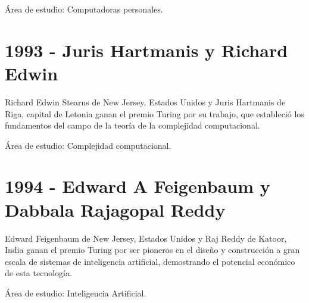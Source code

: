 \documentclass[a4paper, 11pt]{article}
\begin{document}
\noindent Área de estudio: Computadoras personales.
\newline

\section*{1993 - Juris Hartmanis y Richard Edwin}
\noindent Richard Edwin Stearns de New Jersey, Estados Unidos y Juris Hartmanis de Riga, capital de Letonia ganan el premio Turing por su trabajo, que estableció los fundamentos del campo de la teoría de la complejidad computacional.

\noindent Área de estudio: Complejidad computacional.
\newline


\section*{1994 - Edward A Feigenbaum y Dabbala Rajagopal Reddy}
\noindent Edward Feigenbaum de New Jersey, Estados Unidos y Raj Reddy de Katoor, India ganan el premio Turing por ser pioneros en el diseño y construcción a gran escala de sistemas de inteligencia artificial, demostrando el potencial económico de esta tecnología.

\noindent Área de estudio: Inteligencia Artificial.
\newline
\end{document}
